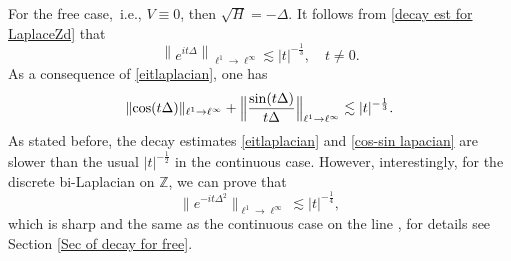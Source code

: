 \documentclass[reqno, 11pt]{amsart}
\newcommand\Z{\mathbb{Z}}
\newcommand\T{\mathbb{T}}
\newcommand\mcaF{\mathcal{F}}
\numberwithin{equation}{section}
\begin{document}

For the free case,~i.e., $V\equiv0$, then $\sqrt{H}=-\Delta$. It follows from \eqref{decay est for LaplaceZd} that
\begin{equation}\label{eitlaplacian}
\left\|e^{it\Delta}\right\|_{\ell^1\rightarrow\ell^{\infty}}\lesssim|t|^{-\frac{1}{3}},\quad t\neq0.
\end{equation}
As a consequence of \eqref{eitlaplacian}, one has
\begin{equation}\label{cos-sin lapacian}
\|{\rm cos}(t\Delta )\|_{\ell^1\rightarrow\ell^{\infty}}+\Big\|\frac{{\rm sin}(t\Delta )}{t\Delta }\Big\|_{\ell^1\rightarrow\ell^{\infty}}\lesssim|t|^{-\frac{1}{3}}.
\end{equation}
As stated before, the decay estimates \eqref{eitlaplacian} and \eqref{cos-sin lapacian} are slower than the usual $|t|^{-\frac{1}{2}}$ in the continuous case. However, interestingly, for the discrete bi-Laplacian on $\Z$, we can prove that
\begin{equation}\label{eitlap2}
\big\|e^{-it\Delta^2}\big\|_{\ell^1\rightarrow\ell^{\infty}}\lesssim|t|^{-\frac{1}{4}},
\end{equation}
which is sharp and the same as the continuous case on the line \cite{SWY22}, for details see Section \ref{Sec of decay for free}.
\end{document}
